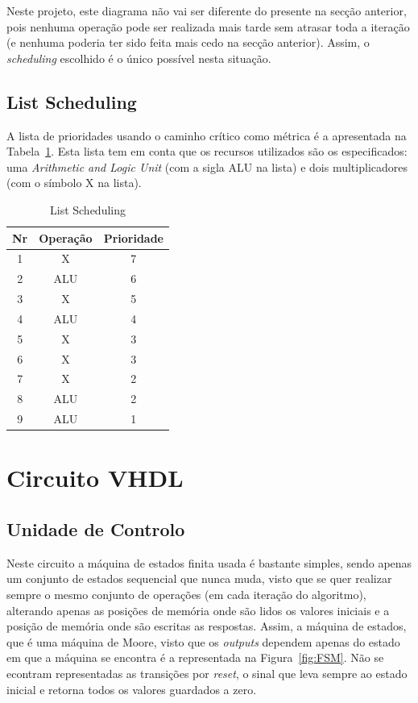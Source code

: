 \documentclass{article} %
\begin{document}
			\noindent Neste projeto, este diagrama não vai ser diferente do presente na secção anterior, pois nenhuma operação pode ser realizada mais tarde sem atrasar toda a iteração (e nenhuma poderia ter sido feita mais cedo na secção anterior). Assim, o \emph{scheduling} escolhido é o único possível nesta situação.

		\subsection{List Scheduling}
		
		A lista de prioridades usando o caminho crítico como métrica é a apresentada na Tabela~\ref{tab:Lsched}. Esta lista tem em conta que os recursos utilizados são os especificados: uma \emph{Arithmetic and Logic Unit} (com a sigla ALU na lista) e dois multiplicadores (com o símbolo X na lista).

		\begin{table}[htbp]
			\caption{List Scheduling}
			\begin{center}
				\begin{tabular}{|c||c||c|}
					\hline
					Nr & Operação & Prioridade \\
					\hline
					1 & X & 7 \\
					\hline
					2 & ALU & 6 \\
					\hline
					3 & X & 5 \\
					\hline
					4 & ALU & 4 \\
					\hline
					5 & X & 3 \\
					\hline
					6 & X & 3 \\
					\hline
					7 & X & 2 \\
					\hline
					8 & ALU & 2 \\
					\hline
					9 & ALU & 1 \\
					\hline
				\end{tabular}
			\end{center}
			\label{tab:Lsched}
		\end{table}

	\section{Circuito VHDL}
		\subsection{Unidade de Controlo}
			Neste circuito a máquina de estados finita usada é bastante simples, sendo apenas um conjunto de estados sequencial que nunca muda, visto que se quer realizar sempre o mesmo conjunto de operações (em cada iteração do algoritmo), alterando apenas as posições de memória onde são lidos os valores iniciais e a posição de memória onde são escritas as respostas. Assim, a máquina de estados, que é uma máquina de Moore, visto que os \emph{outputs} dependem apenas do estado em que a máquina se encontra é a representada na Figura~\ref{fig:FSM}. Não se econtram representadas as transições por \emph{reset}, o sinal que leva sempre ao estado inicial e retorna todos os valores guardados a zero.\\
\end{document}
